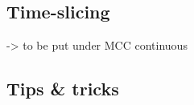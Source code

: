 \documentclass[english]{paper}
\begin{document}
\subsection{Time-slicing}
-> to be put under MCC continuous 

% 
% 

\subsection{Tips \& tricks}
\label{tips}
% 




 
\end{document}
